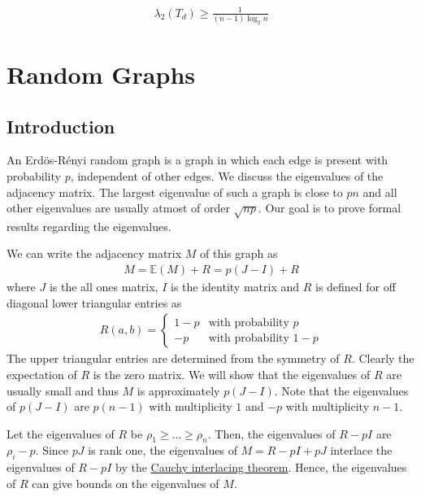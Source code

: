 \documentclass{math}
\newcommand{\expect}{\mathbb{E}}
\begin{document}
\begin{lemma}
    \begin{align*}
        \lambda_2(T_d) \geq \frac{1}{(n - 1) \log_2 n}
    \end{align*}
\end{lemma}

\section{Random Graphs}

\subsection{Introduction}

An Erd\"{o}s-R\'{e}nyi random graph is a graph in which each edge is present with probability $p$, independent of other edges.
We discuss the eigenvalues of the adjacency matrix.
The largest eigenvalue of such a graph is close to $pn$ and all other eigenvalues are usually atmost of order $\sqrt{np}$.
Our goal is to prove formal results regarding the eigenvalues.

We can write the adjacency matrix $M$ of this graph as
\begin{align*}
    M = \expect(M) + R = p(J - I) + R
\end{align*}
where $J$ is the all ones matrix, $I$ is the identity matrix and $R$ is defined for off diagonal lower triangular entries as
\begin{align*}
    R(a, b) = \begin{cases}
                  1 - p & \text{with probability $p$}   \\
                  -p    & \text{with probability $1-p$}
              \end{cases}
\end{align*}
The upper triangular entries are determined from the symmetry of $R$.
Clearly the expectation of $R$ is the zero matrix.
We will show that the eigenvalues of $R$ are usually small
and thus $M$ is approximately $p(J - I)$. Note that the eigenvalues of $p(J - I)$ are $p(n - 1)$ with multiplicity $1$ and $-p$ with multiplicity $n - 1$.

Let the eigenvalues of $R$ be $\rho_1 \geq ... \geq \rho_n$.
Then, the eigenvalues of $R - pI$ are $\rho_i - p$.
Since $pJ$ is rank one, the eigenvalues of $M = R - pI + pJ$ interlace the eigenvalues of $R - pI$ by the \hyperref[thm:cauchy-rank-one]{Cauchy interlacing theorem}.
Hence, the eigenvalues of $R$ can give bounds on the eigenvalues of $M$.
\end{document}

